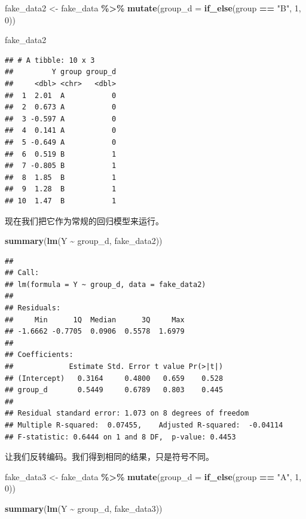 \documentclass[
]{book}
\newenvironment{Shaded}{\begin{snugshade}}{\end{snugshade}}
\newcommand{\AttributeTok}[1]{\textcolor[rgb]{0.13,0.29,0.53}{#1}}
\newcommand{\DecValTok}[1]{\textcolor[rgb]{0.00,0.00,0.81}{#1}}
\newcommand{\FunctionTok}[1]{\textcolor[rgb]{0.13,0.29,0.53}{\textbf{#1}}}
\newcommand{\NormalTok}[1]{#1}
\newcommand{\OtherTok}[1]{\textcolor[rgb]{0.56,0.35,0.01}{#1}}
\newcommand{\SpecialCharTok}[1]{\textcolor[rgb]{0.81,0.36,0.00}{\textbf{#1}}}
\newcommand{\StringTok}[1]{\textcolor[rgb]{0.31,0.60,0.02}{#1}}
\begin{document}
\begin{Shaded}
\begin{Highlighting}[]
\NormalTok{fake\_data2 }\OtherTok{\textless{}{-}}\NormalTok{ fake\_data }\SpecialCharTok{\%\textgreater{}\%}
  \FunctionTok{mutate}\NormalTok{(}\AttributeTok{group\_d =} \FunctionTok{if\_else}\NormalTok{(group }\SpecialCharTok{==} \StringTok{"B"}\NormalTok{, }\DecValTok{1}\NormalTok{, }\DecValTok{0}\NormalTok{))}

\NormalTok{fake\_data2}
\end{Highlighting}
\end{Shaded}

\begin{verbatim}
## # A tibble: 10 x 3
##         Y group group_d
##     <dbl> <chr>   <dbl>
##  1  2.01  A           0
##  2  0.673 A           0
##  3 -0.597 A           0
##  4  0.141 A           0
##  5 -0.649 A           0
##  6  0.519 B           1
##  7 -0.805 B           1
##  8  1.85  B           1
##  9  1.28  B           1
## 10  1.47  B           1
\end{verbatim}

现在我们把它作为常规的回归模型来运行。

\begin{Shaded}
\begin{Highlighting}[]
\FunctionTok{summary}\NormalTok{(}\FunctionTok{lm}\NormalTok{(Y }\SpecialCharTok{\textasciitilde{}}\NormalTok{ group\_d, fake\_data2))}
\end{Highlighting}
\end{Shaded}

\begin{verbatim}
## 
## Call:
## lm(formula = Y ~ group_d, data = fake_data2)
## 
## Residuals:
##     Min      1Q  Median      3Q     Max 
## -1.6662 -0.7705  0.0906  0.5578  1.6979 
## 
## Coefficients:
##             Estimate Std. Error t value Pr(>|t|)
## (Intercept)   0.3164     0.4800   0.659    0.528
## group_d       0.5449     0.6789   0.803    0.445
## 
## Residual standard error: 1.073 on 8 degrees of freedom
## Multiple R-squared:  0.07455,    Adjusted R-squared:  -0.04114 
## F-statistic: 0.6444 on 1 and 8 DF,  p-value: 0.4453
\end{verbatim}

让我们反转编码。我们得到相同的结果，只是符号不同。

\begin{Shaded}
\begin{Highlighting}[]
\NormalTok{fake\_data3 }\OtherTok{\textless{}{-}}\NormalTok{ fake\_data }\SpecialCharTok{\%\textgreater{}\%}
  \FunctionTok{mutate}\NormalTok{(}\AttributeTok{group\_d =} \FunctionTok{if\_else}\NormalTok{(group }\SpecialCharTok{==} \StringTok{"A"}\NormalTok{, }\DecValTok{1}\NormalTok{, }\DecValTok{0}\NormalTok{))}

\FunctionTok{summary}\NormalTok{(}\FunctionTok{lm}\NormalTok{(Y }\SpecialCharTok{\textasciitilde{}}\NormalTok{ group\_d, fake\_data3))}
\end{Highlighting}
\end{Shaded}
\end{document}
